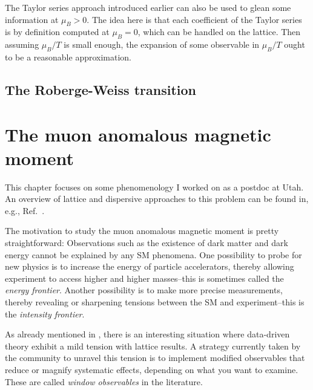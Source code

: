 The Taylor series approach introduced earlier can also be used to
glean some information at $\mu_B>0$. The idea here is that each
coefficient of the Taylor series is by definition computed at
$\mu_B=0$, which can be handled on the lattice. Then assuming
$\mu_B/T$ is small enough, the expansion of some observable in
$\mu_B/T$ ought to be a reasonable approximation.

\subsection{The Roberge-Weiss transition}\label{sec:RW}



\section{The muon anomalous magnetic moment}\label{sec:muonAnom}

This chapter focuses on some phenomenology I worked on as a postdoc at Utah.
An overview of lattice and dispersive approaches to this problem can
be found in, e.g., Ref.~\cite{aoyama_anomalous_2020}.

The motivation to study the muon anomalous magnetic moment is pretty
straightforward: Observations such as the existence of dark matter and
dark energy cannot be explained by any SM phenomena. One possibility to probe
for new physics is to increase the energy of particle accelerators, thereby
allowing experiment to access higher and higher masses--this is sometimes
called the {\it energy frontier}.
Another possibility is to make more precise measurements, thereby revealing or
sharpening tensions between the SM and experiment--this is
the {\it intensity frontier}.

As already mentioned in , there is an interesting situation
where data-driven theory exhibit a mild tension with lattice results.
A strategy currently taken by the community to unravel this tension is to
implement modified observables that reduce or magnify systematic effects,
depending on what you want to examine. These are called {\it window observables}
in the literature.

